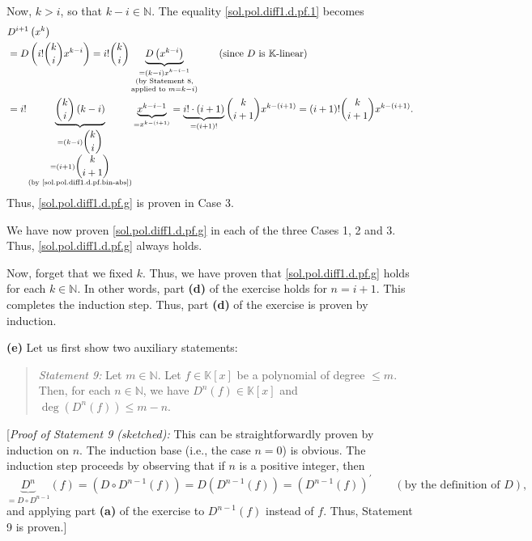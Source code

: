 \documentclass[paper=a4, fontsize=12pt]{scrartcl}%
\theoremstyle{plainsl}
\theoremstyle{definition}
\theoremstyle{remark}
\newenvironment{statement}{\begin{quote}}{\end{quote}}
\begin{document}
Now, $k>i$, so that $k-i\in\mathbb{N}$. The equality
\eqref{sol.pol.diff1.d.pf.1} becomes%
\begin{align*}
&  D^{i+1}\left(  x^{k}\right) \\
&  =D\left(  i!\dbinom{k}{i}x^{k-i}\right)  =i!\dbinom{k}{i}%
\underbrace{D\left(  x^{k-i}\right)  }_{\substack{=\left(  k-i\right)
x^{k-i-1}\\\text{(by Statement 8,}\\\text{applied to }m=k-i\text{)}}%
}\qquad\left(  \text{since }D\text{ is }\mathbb{K}\text{-linear}\right) \\
&  =i!\underbrace{\dbinom{k}{i}\left(  k-i\right)  }_{\substack{=\left(
k-i\right)  \dbinom{k}{i}\\=\left(  i+1\right)  \dbinom{k}{i+1}\\\text{(by
\eqref{sol.pol.diff1.d.pf.bin-abs})}}}\underbrace{x^{k-i-1}}_{=x^{k-\left(
i+1\right)  }}=\underbrace{i!\cdot\left(  i+1\right)  }_{=\left(  i+1\right)
!}\dbinom{k}{i+1}x^{k-\left(  i+1\right)  }=\left(  i+1\right)  !\dbinom
{k}{i+1}x^{k-\left(  i+1\right)  }.
\end{align*}
Thus, \eqref{sol.pol.diff1.d.pf.g} is proven in Case 3.

We have now proven \eqref{sol.pol.diff1.d.pf.g} in each of the three Cases 1,
2 and 3. Thus, \eqref{sol.pol.diff1.d.pf.g} always holds.

Now, forget that we fixed $k$. Thus, we have proven that
\eqref{sol.pol.diff1.d.pf.g} holds for each $k\in\mathbb{N}$. In other words,
part \textbf{(d)} of the exercise holds for $n=i+1$. This completes the
induction step. Thus, part \textbf{(d)} of the exercise is proven by induction.

\bigskip

\textbf{(e)} Let us first show two auxiliary statements:

\begin{statement}
\textit{Statement 9:} Let $m\in\mathbb{N}$. Let $f\in\mathbb{K}\left[
x\right]  $ be a polynomial of degree $\leq m$. Then, for each $n\in
\mathbb{N}$, we have $D^{n}\left(  f\right)  \in\mathbb{K}\left[  x\right]  $
and $\deg\left(  D^{n}\left(  f\right)  \right)  \leq m-n$.
\end{statement}

[\textit{Proof of Statement 9 (sketched):} This can be straightforwardly
proven by induction on $n$. The induction base (i.e., the case $n=0$) is
obvious. The induction step proceeds by observing that if $n$ is a positive
integer, then%
\[
\underbrace{D^{n}}_{=D\circ D^{n-1}}\left(  f\right)  =\left(  D\circ
D^{n-1}\left(  f\right)  \right)  =D\left(  D^{n-1}\left(  f\right)  \right)
=\left(  D^{n-1}\left(  f\right)  \right)  ^{\prime}\qquad\left(  \text{by the
definition of }D\right)  ,
\]
and applying part \textbf{(a)} of the exercise to $D^{n-1}\left(  f\right)  $
instead of $f$. Thus, Statement 9 is proven.]
\end{document}
